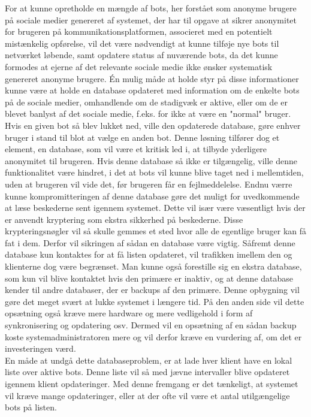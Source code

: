 For at kunne opretholde en mængde af bots, her forstået som anonyme brugere på sociale medier genereret af systemet, der har til opgave at sikrer anonymitet for brugeren på kommunikationsplatformen, associeret med en potentielt mistænkelig opførelse, vil det være nødvendigt at kunne tilføje nye bots til netværket løbende, samt opdatere status af nuværende bots, da det kunne formodes at ejerne af det relevante sociale medie ikke ønsker systematisk genereret anonyme brugere. Én mulig måde at holde styr på disse informationer kunne være at holde en database opdateret med information om de enkelte bots på de sociale medier, omhandlende om de stadigvæk er aktive, eller om de er blevet banlyst af det sociale medie, f.eks. for ikke at være en "normal" bruger. Hvis en given bot så blev lukket ned, ville den opdaterede database, gøre enhver bruger i stand til blot at vælge en anden bot. Denne løsning tilfører dog et element, en database, som vil være et kritisk led i, at tilbyde yderligere anonymitet til brugeren. Hvis denne database så ikke er tilgængelig, ville denne funktionalitet være hindret, i det at bots vil kunne blive taget ned i mellemtiden, uden at brugeren vil vide det, før brugeren får en fejlmeddelelse. Endnu værre kunne kompromitteringen af denne database gøre det muligt for uvedkommende at læse beskederne sent igennem systemet. Dette vil især være væsentligt hvis der er anvendt kryptering som ekstra sikkerhed på beskederne. Disse krypteringsnøgler vil så skulle gemmes et sted hvor alle de egentlige bruger kan få fat i dem. Derfor vil sikringen af sådan en database være vigtig. Såfremt denne database kun kontaktes for at få listen opdateret, vil trafikken imellem den og klienterne dog være begrænset. Man kunne også forestille sig en ekstra database, som kun vil blive kontaktet hvis den primære er inaktiv, og at denne database kender til andre databaser, der er backups af den primære. Denne opbygning vil gøre det meget svært at lukke systemet i længere tid. På den anden side vil dette opsætning også kræve mere hardware og mere vedligehold i form af synkronisering og opdatering osv. Dermed vil en opsætning af en sådan backup koste systemadministratoren mere og vil derfor kræve en vurdering af, om det er investeringen værd.\\
En måde at undgå dette databaseproblem, er at lade hver klient have en lokal liste over aktive bots. Denne liste vil så med jævne intervaller blive opdateret igennem klient opdateringer. Med denne fremgang er det tænkeligt, at systemet vil kræve mange opdateringer, eller at der ofte vil være et antal utilgængelige bots på listen.
